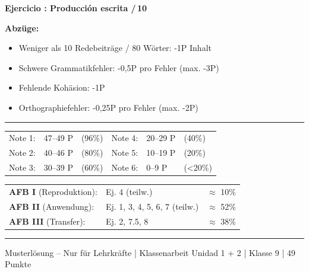 \documentclass[a4paper,11pt]{article}
\newcommand{\punkte}[1]{\hfill\textcolor{mittelgrau}{\small /\,#1}}
\newcounter{aufgabe}
\newenvironment{aufgabe}[2]{%
    \refstepcounter{aufgabe}
    \vspace{4mm}
    \noindent\textbf{\color{spanisch}Ejercicio \theaufgabe: #1 \punkte{#2}}
    \vspace{1.5mm}
    \par
}{%
    \vspace{2mm}
}
\begin{document}
\begin{aufgabe}{Producción escrita}{10}
\vspace{4mm}

{\small\color{mittelgrau}\textbf{Abzüge:}
\begin{itemize}[itemsep=0mm, topsep=1mm]
    \item Weniger als 10 Redebeiträge / 80 Wörter: -1P Inhalt
    \item Schwere Grammatikfehler: -0,5P pro Fehler (max. -3P)
    \item Fehlende Kohäsion: -1P
    \item Orthographiefehler: -0,25P pro Fehler (max. -2P)
\end{itemize}}

\end{aufgabe}

\vspace{5mm}

\noindent\rule{\textwidth}{0.4pt}

\vspace{2mm}

\noindent
\begin{tcolorbox}[colback=hellgrau, colframe=spanisch, boxrule=1pt, arc=0pt, title={\color{white}\textbf{Notenschlüssel (49 Punkte)}}]
\begin{tabular}{lll|lll}
Note 1: & 47--49 P & (96\%) & Note 4: & 20--29 P & (40\%) \\
Note 2: & 40--46 P & (80\%) & Note 5: & 10--19 P & (20\%) \\
Note 3: & 30--39 P & (60\%) & Note 6: & 0--9 P & (<20\%) \\
\end{tabular}
\end{tcolorbox}

\vspace{3mm}

\noindent
\begin{tcolorbox}[colback=wahlfarbe!10, colframe=wahlfarbe, boxrule=1pt, arc=0pt, title={\color{white}\textbf{AFB-Verteilung}}]
\begin{tabular}{lll}
\textbf{AFB I} (Reproduktion): & Ej. 4 (teilw.) & $\approx$ 10\% \\
\textbf{AFB II} (Anwendung): & Ej. 1, 3, 4, 5, 6, 7 (teilw.) & $\approx$ 52\% \\
\textbf{AFB III} (Transfer): & Ej. 2, 7.5, 8 & $\approx$ 38\% \\
\end{tabular}
\end{tcolorbox}

\vfill

\noindent\rule{\textwidth}{0.4pt}
{\small\color{mittelgrau} Musterlösung -- Nur für Lehrkräfte | Klassenarbeit Unidad 1 + 2 | Klasse 9 | 49 Punkte}
\end{document}
